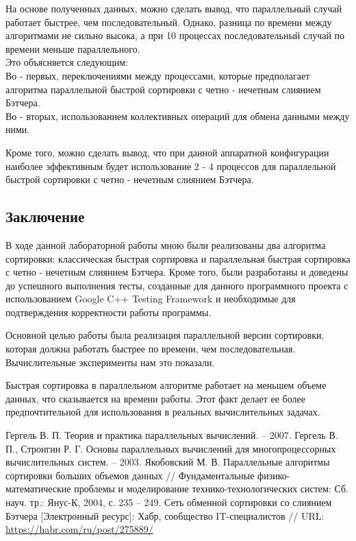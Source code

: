 \documentclass[a4paper]{report}
\begin{document}
\par На основе полученных данных, можно сделать вывод, что параллельный случай работает быстрее, чем последовательный. Однако, разница по времени между алгоритмами не сильно высока, а при 10 процессах последовательный случай по времени меньше параллельного.\\
Это объясняется следующим:\\
Во - первых, переключениями между процессами, которые предполагает алгоритма параллельной быстрой сортировки с четно - нечетным слиянием Бэтчера.\\
Во - вторых, использованием коллективных операций для обмена данными между ними.
\par Кроме того, можно сделать вывод, что при данной аппаратной конфигурации наиболее эффективным будет использование 2 - 4 процессов для параллельной быстрой сортировки с четно - нечетным слиянием Бэтчера.
\newpage

\begin{center}
\section*{Заключение}
\end{center}
\par В ходе данной лабораторной работы мною были реализованы два алгоритма сортировки: классическая быстрая сортировка и параллельная быстрая сортировка с четно - нечетным слиянием Бэтчера. Кроме того, были разработаны и доведены до успешного выполнения тесты, созданные для данного программного проекта с использованием Google C++ Testing Framework и необходимые для подтверждения корректности работы программы.
\par Основной целью работы была реализация параллельной версии сортировки, которая должна работать быстрее по времени, чем последовательная.
Вычислительные эксперименты нам это показали.
\par Быстрая сортировка в параллельном алгоритме работает на меньшем объеме данных,
что сказывается на времени работы. Этот факт делает ее более предпочтительной для использования в реальных вычислительных задачах.
\newpage

\begin{thebibliography}{}
 Гергель В. П. Теория и практика параллельных вычислений. – 2007.
 Гергель В. П., Стронгин Р. Г. Основы параллельных вычислений для многопроцессорных вычислительных систем. – 2003.
 Якобовский М. В. Параллельные алгоритмы сортировки больших объемов
данных // Фундаментальные физико-математические проблемы и
моделирование технико-технологических систем: Сб. науч. тр.: Янус-К, 2004,
с. 235 – 249.
 Сеть обменной сортировки со слиянием Бэтчера [Электронный ресурс]: Хабр,
сообщество IT-специалистов // URL: \url{https://habr.com/ru/post/275889/}
\end{thebibliography}{}
\newpage
\end{document}
